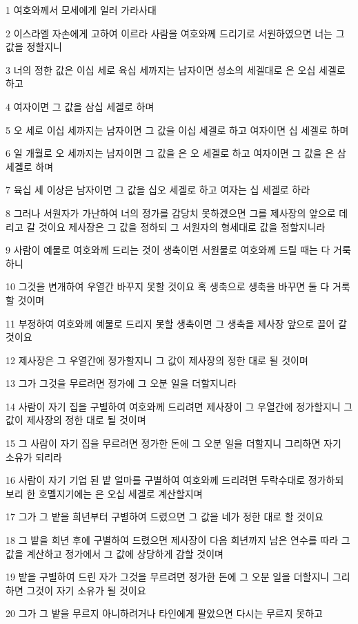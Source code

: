 \par 1 여호와께서 모세에게 일러 가라사대
\par 2 이스라엘 자손에게 고하여 이르라 사람을 여호와께 드리기로 서원하였으면 너는 그 값을 정할지니
\par 3 너의 정한 값은 이십 세로 육십 세까지는 남자이면 성소의 세겔대로 은 오십 세겔로 하고
\par 4 여자이면 그 값을 삼십 세겔로 하며
\par 5 오 세로 이십 세까지는 남자이면 그 값을 이십 세겔로 하고 여자이면 십 세겔로 하며
\par 6 일 개월로 오 세까지는 남자이면 그 값을 은 오 세겔로 하고 여자이면 그 값을 은 삼 세겔로 하며
\par 7 육십 세 이상은 남자이면 그 값을 십오 세겔로 하고 여자는 십 세겔로 하라
\par 8 그러나 서원자가 가난하여 너의 정가를 감당치 못하겠으면 그를 제사장의 앞으로 데리고 갈 것이요 제사장은 그 값을 정하되 그 서원자의 형세대로 값을 정할지니라
\par 9 사람이 예물로 여호와께 드리는 것이 생축이면 서원물로 여호와께 드릴 때는 다 거룩하니
\par 10 그것을 변개하여 우열간 바꾸지 못할 것이요 혹 생축으로 생축을 바꾸면 둘 다 거룩할 것이며
\par 11 부정하여 여호와께 예물로 드리지 못할 생축이면 그 생축을 제사장 앞으로 끌어 갈 것이요
\par 12 제사장은 그 우열간에 정가할지니 그 값이 제사장의 정한 대로 될 것이며
\par 13 그가 그것을 무르려면 정가에 그 오분 일을 더할지니라
\par 14 사람이 자기 집을 구별하여 여호와께 드리려면 제사장이 그 우열간에 정가할지니 그 값이 제사장의 정한 대로 될 것이며
\par 15 그 사람이 자기 집을 무르려면 정가한 돈에 그 오분 일을 더할지니 그리하면 자기 소유가 되리라
\par 16 사람이 자기 기업 된 밭 얼마를 구별하여 여호와께 드리려면 두락수대로 정가하되 보리 한 호멜지기에는 은 오십 세겔로 계산할지며
\par 17 그가 그 밭을 희년부터 구별하여 드렸으면 그 값을 네가 정한 대로 할 것이요
\par 18 그 밭을 희년 후에 구별하여 드렸으면 제사장이 다음 희년까지 남은 연수를 따라 그 값을 계산하고 정가에서 그 값에 상당하게 감할 것이며
\par 19 밭을 구별하여 드린 자가 그것을 무르려면 정가한 돈에 그 오분 일을 더할지니 그리하면 그것이 자기 소유가 될 것이요
\par 20 그가 그 밭을 무르지 아니하려거나 타인에게 팔았으면 다시는 무르지 못하고
